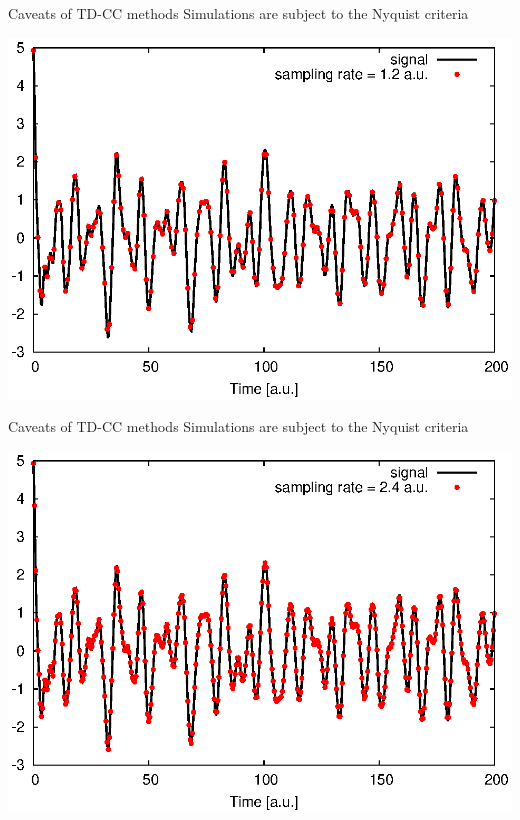 \documentclass{beamer}
\begin{document}
\begin{frame}{Caveats of TD-CC methods}
Simulations are subject to the Nyquist criteria
\begin{center}
  \includegraphics[scale=0.8]{figures/nyquist4.eps}
\end{center}
\end{frame}

\begin{frame}{Caveats of TD-CC methods}
Simulations are subject to the Nyquist criteria
\begin{center}
  \includegraphics[scale=0.8]{figures/nyquist5.eps}
\end{center}
\end{frame}
\end{document}
